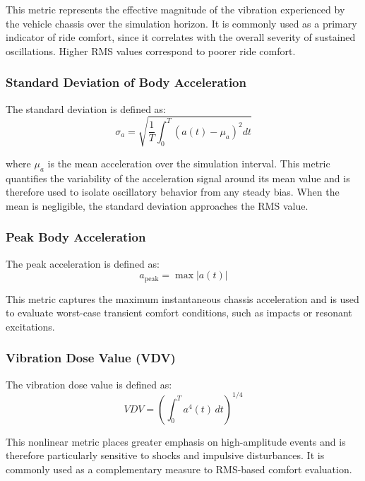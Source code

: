 This metric represents the effective magnitude of the vibration experienced by the vehicle chassis over the simulation horizon. It is commonly used as a primary indicator of ride comfort, since it correlates with the overall severity of sustained oscillations. Higher RMS values correspond to poorer ride comfort.

\subsubsection{Standard Deviation of Body Acceleration}

The standard deviation is defined as:
\begin{equation}
\sigma_a = \sqrt{\frac{1}{T} \int_0^T \left(a(t) - \mu_a\right)^2 dt}
\end{equation}

where $\mu_a$ is the mean acceleration over the simulation interval. This metric quantifies the variability of the acceleration signal around its mean value and is therefore used to isolate oscillatory behavior from any steady bias. When the mean is negligible, the standard deviation approaches the RMS value.

\subsubsection{Peak Body Acceleration}

The peak acceleration is defined as:
\begin{equation}
a_{\mathrm{peak}} = \max |a(t)|
\end{equation}

This metric captures the maximum instantaneous chassis acceleration and is used to evaluate worst-case transient comfort conditions, such as impacts or resonant excitations.

\subsubsection{Vibration Dose Value (VDV)}

The vibration dose value is defined as:
\begin{equation}
VDV = \left( \int_0^T a^4(t)\,dt \right)^{1/4}
\end{equation}

This nonlinear metric places greater emphasis on high-amplitude events and is therefore particularly sensitive to shocks and impulsive disturbances. It is commonly used as a complementary measure to RMS-based comfort evaluation.


